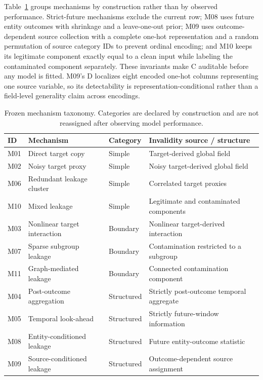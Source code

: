 \documentclass[letterpaper]{article}
\begin{document}
Table~\ref{tab:mechanisms} groups mechanisms by construction rather than by
observed performance.  Strict-future mechanisms exclude the current row; M08
uses future entity outcomes with shrinkage and a leave-one-out prior; M09 uses
outcome-dependent source collection with a complete one-hot representation and
a random permutation of source category IDs to prevent ordinal encoding; and
M10 keeps its legitimate component exactly equal
to a clean input while labeling the contaminated component separately.  These
invariants make C auditable before any model is fitted.
M09's D localizes eight encoded one-hot columns representing one source
variable, so its detectability is representation-conditional rather than a
field-level generality claim across encodings.

\begin{table}[t]
\centering
\small
\begin{tabular}{llll}
\toprule
ID & Mechanism & Category & Invalidity source / structure \\
\midrule
M01 & Direct target copy & Simple & Target-derived global field \\
M02 & Noisy target proxy & Simple & Noisy target-derived global field \\
M06 & Redundant leakage cluster & Simple & Correlated target proxies \\
M10 & Mixed leakage & Simple & Legitimate and contaminated components \\
M03 & Nonlinear target interaction & Boundary & Nonlinear target-derived interaction \\
M07 & Sparse subgroup leakage & Boundary & Contamination restricted to a subgroup \\
M11 & Graph-mediated leakage & Boundary & Connected contamination component \\
M04 & Post-outcome aggregation & Structured & Strictly post-outcome temporal aggregate \\
M05 & Temporal look-ahead & Structured & Strictly future-window information \\
M08 & Entity-conditioned leakage & Structured & Future entity-outcome statistic \\
M09 & Source-conditioned leakage & Structured & Outcome-dependent source assignment \\
\bottomrule
\end{tabular}
\caption{Frozen mechanism taxonomy.  Categories are declared by construction
and are not reassigned after observing model performance.}
\label{tab:mechanisms}
\end{table}
\end{document}
